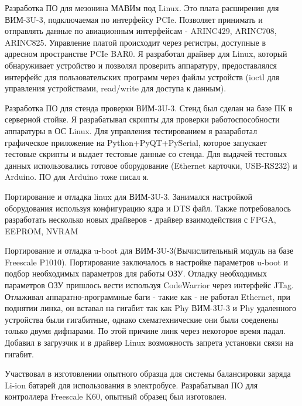 {\begin{itemize-noindent}
\item{Разработка ПО для мезонина МАВИм под Linux. Это плата расширения для ВИМ-3U-3, подключаемая по интерфейсу PCIe. Позволяет принимать и отправлять данные по авиационным интерфейсам - ARINC429, ARINC708, ARINC825. Управление платой происходит через регистры, доступные в адресном пространстве PCIe BAR0. Я разработал драйвер для Linux, который обнаруживает устройство и позволял проверить аппаратуру, предоставлялся интерфейс для пользовательских программ через файлы устройств (ioctl для управления устройствами, read/write для доступа к данным).}
\item{Разработка ПО для стенда проверки ВИМ-3U-3. Стенд был сделан на базе ПК в серверной стойке. Я разрабатывал скрипты для проверки работоспособности аппаратуры в ОС Linux. Для управления тестированием я разаработал графическое приложение на Python+PyQT+PySerial, которое запускает тестовые скрипты и выдает тестовые данные со стенда. Для выдачей тестовых данных использовались готовое оборудование (Ethernet карточки, USB-RS232) и Arduino. ПО для Arduino тоже писал я.}
\newpage
\item{Портирование и отладка linux для ВИМ-3U-3. Занимался настройкой оборудования используя конфигурацию ядра и DTS файл. Также потребовалось разработать несколько новых драйверов - драйвер взаимодействия с FPGA, EEPROM, NVRAM }
\item Портирование и отладка u-boot для ВИМ-3U-3(Вычислительный модуль на базе Freescale P1010). Портирование заключалось в настройке параметров u-boot и подбор необходимых параметров для работы ОЗУ. Отладку необходимых параметров ОЗУ пришлось вести используя CodeWarrior через интерфейс JTag. Отлаживал аппаратно-программные баги - такие как - не работал Ethernet, при поднятии линка, он вставал на гигабит так как Phy ВИМ-3U-3 и Phy удаленного устройства были гигабитные, однако схематехнические они были соеденены только двумя дифпарами. По этой причине линк через некоторое время падал. Добавил в загрузчик и в драйвер Linux возможность запрета установки связи на гигабит.
\newpage
\item{Участвовал в изготовлении опытного образца для системы балансировки заряда Li-ion батарей для использования в электробусе. Разрабатывал ПО для контроллера Freescale K60, опытный образец был изготовлен.}
\end{itemize-noindent}
}


